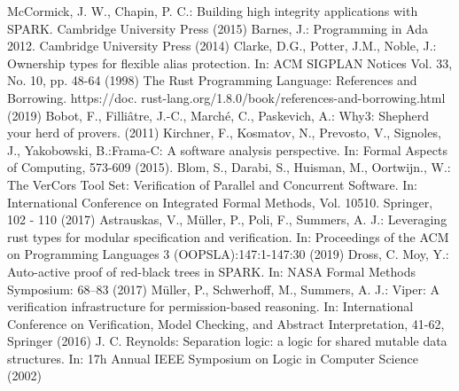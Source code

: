 \documentclass[runningheads]{llncs}
\begin{document}
%
%
%
% 
% 
%
\begin{thebibliography}{8}
McCormick, J. W., Chapin, P. C.: Building high integrity applications with SPARK. Cambridge University Press (2015)
Barnes, J.: Programming in Ada 2012. Cambridge University Press (2014)
Clarke, D.G., Potter, J.M., Noble, J.: Ownership types for flexible alias protection. In: ACM SIGPLAN Notices Vol. 33, No. 10, pp. 48-64 (1998)
  The Rust Programming Language: References and Borrowing. https://doc.
rust-lang.org/1.8.0/book/references-and-borrowing.html (2019)
  Bobot, F., Filli{\^a}tre, J.-C., March{\'e}, C., Paskevich, A.: Why3: Shepherd your herd of provers. (2011)
  Kirchner, F., Kosmatov, N., Prevosto, V., Signoles, J., Yakobowski, B.:Frama-C: A software analysis perspective. In: Formal Aspects of Computing, 573-609 (2015).
Blom, S., Darabi, S., Huisman, M., Oortwijn., W.: The VerCors Tool Set: Verification of Parallel and Concurrent Software. In:  International Conference on Integrated Formal Methods, Vol. 10510. Springer, 102 - 110 (2017)
  Astrauskas, V., M{\"u}ller, P., Poli, F., Summers, A. J.: Leveraging rust types for modular specification and verification.
  In: Proceedings of the ACM on Programming Languages 3 (OOPSLA):147:1-147:30 (2019)
  Dross, C. Moy, Y.: Auto-active proof of red-black trees in SPARK.
  In: NASA Formal Methods Symposium: 68--83 (2017)
M{\"u}ller, P., Schwerhoff, M., Summers, A. J.: Viper: A verification infrastructure for permission-based reasoning. In: International Conference on Verification, Model Checking, and Abstract Interpretation, 41-62, Springer (2016)
J. C. Reynolds: Separation logic: a logic for shared mutable data structures. In: 17h Annual IEEE
Symposium on Logic in Computer Science (2002)
\end{thebibliography}
\end{document}
